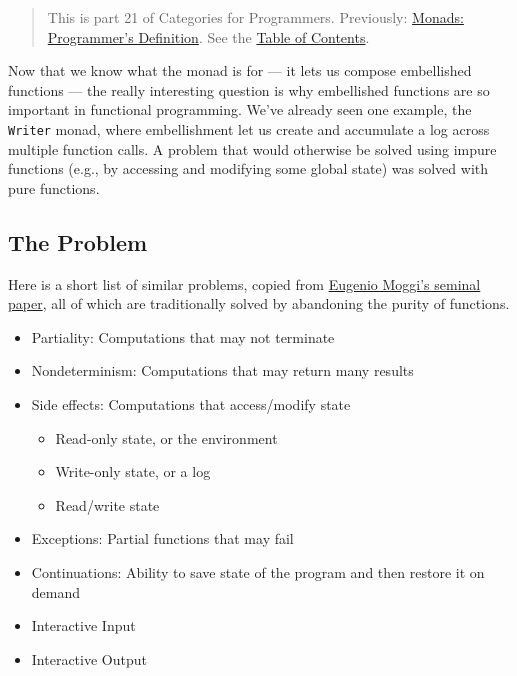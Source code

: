 \begin{quote}
This is part 21 of Categories for Programmers. Previously:
\href{https://bartoszmilewski.com/2016/11/21/monads-programmers-definition/}{Monads:
Programmer's Definition}. See the
\href{https://bartoszmilewski.com/2014/10/28/category-theory-for-programmers-the-preface/}{Table
of Contents}.
\end{quote}

Now that we know what the monad is for --- it lets us compose
embellished functions --- the really interesting question is why
embellished functions are so important in functional programming. We've
already seen one example, the \texttt{Writer} monad, where embellishment
let us create and accumulate a log across multiple function calls. A
problem that would otherwise be solved using impure functions (e.g., by
accessing and modifying some global state) was solved with pure
functions.

\subsection{The Problem}\label{the-problem}

Here is a short list of similar problems, copied from
\href{https://core.ac.uk/download/pdf/21173011.pdf}{Eugenio Moggi's
seminal paper}, all of which are traditionally solved by abandoning the
purity of functions.

\begin{itemize}
\tightlist
\item
  Partiality: Computations that may not terminate
\item
  Nondeterminism: Computations that may return many results
\item
  Side effects: Computations that access/modify state

  \begin{itemize}
  \tightlist
  \item
    Read-only state, or the environment
  \item
    Write-only state, or a log
  \item
    Read/write state
  \end{itemize}
\item
  Exceptions: Partial functions that may fail
\item
  Continuations: Ability to save state of the program and then restore
  it on demand
\item
  Interactive Input
\item
  Interactive Output
\end{itemize}

